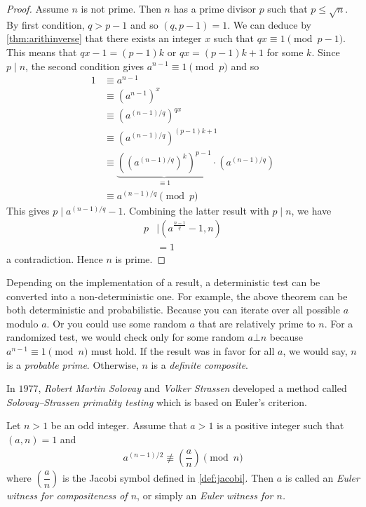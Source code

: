 \documentclass{subfiles}
\begin{document}
		\begin{proof}
			Assume $n$ is not prime. Then $n$ has a prime divisor $p$ such that $p \leq \sqrt n$. By first condition, $q>p-1$ and so $(q, p-1)=1$. We can deduce by \autoref{thm:arithinverse} that there exists an integer $x$ such that $qx \equiv 1 \pmod {p-1}$. This means that $qx-1 = (p-1)k$ or $qx = (p-1)k+1$ for some $k$. Since $p\mid n$, the second condition gives $a^{n-1} \equiv 1 \pmod p$ and so
				\begin{align*}
					1 & \equiv a^{n-1} \\
					  & \equiv \left(a^{n-1}\right)^{x}\\
					  & \equiv \left(a^{(n-1)/q}\right)^{qx}\\
					  & \equiv \left(a^{(n-1)/q}\right)^{(p-1)k+1}\\
					  & \equiv \underbrace{\left(\left(a^{(n-1)/q}\right)^{k}\right)^{p-1}}_{\equiv 1} \cdot \left(a^{(n-1)/q}\right)\\
					  & \equiv a^{(n-1)/q} \pmod p
				\end{align*}
			This gives $p\mid a^{(n-1)/q}-1$. Combining the latter result with $p\mid n$, we have
				\begin{align*}
					p
						& \mid \left(a^{\frac{n-1}{q}}-1,n\right)\\
						&=1
				\end{align*}
			a contradiction. Hence $n$ is prime.
		\end{proof}

		\begin{note}
			Depending on the implementation of a result, a deterministic test can be converted into a non-deterministic one. For example, the above theorem can be both deterministic and probabilistic. Because you can iterate over all possible $a$ modulo $a$. Or you could use some random $a$ that are relatively prime to $n$. For a randomized test, we would check only for some random $a\bot n$ because $a^{n-1}\equiv1\pmod n$ must hold. If the result was in favor for all $a$, we would say, $n$ is a \textit{probable prime}. Otherwise, $n$ is a \textit{definite composite}.
		\end{note}
	In $1977$, \textit{Robert Martin Solovay} and \textit{Volker Strassen} developed a method called \textit{Solovay--Strassen primality testing} which is based on Euler's criterion.

		\begin{definition}
			Let $n>1$ be an odd integer. Assume that $a>1$ is a positive integer such that $(a,n)=1$ and
				\begin{align*}
					a^{(n-1)/2} \not \equiv \left(\dfrac{a}{n}\right) \pmod n
				\end{align*}
			where $\left(\dfrac{a}{n}\right)$ is the Jacobi symbol defined in \eqref{def:jacobi}. Then $a$ is called an \textit{Euler witness for compositeness of $n$}, or simply an \textit{Euler witness for $n$.}
		\end{definition}
\end{document}
